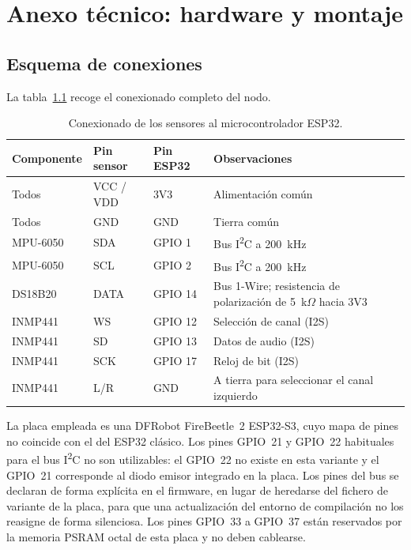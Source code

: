 \chapter{Anexo técnico: hardware y montaje}
\label{anexo:hardware}

\section{Esquema de conexiones}

La tabla~\ref{table:pinout} recoge el conexionado completo del nodo.

\begin{table}[ht!]
\caption{Conexionado de los sensores al microcontrolador ESP32.}
\label{table:pinout}
\centering
\begin{tabular}{|p{3cm}|p{2.5cm}|p{2cm}|p{5cm}|}
\hline
\textbf{Componente} & \textbf{Pin sensor} & \textbf{Pin ESP32} & \textbf{Observaciones} \\
\hline
Todos & VCC / VDD & 3V3 & Alimentación común \\
\hline
Todos & GND & GND & Tierra común \\
\hline
MPU-6050 & SDA & GPIO 1 & Bus I\textsuperscript{2}C a \mbox{200 kHz} \\
\hline
MPU-6050 & SCL & GPIO 2 & Bus I\textsuperscript{2}C a \mbox{200 kHz} \\
\hline
DS18B20 & DATA & GPIO 14 & Bus 1-Wire; resistencia de polarización de
\mbox{5 k$\Omega$} hacia 3V3 \\
\hline
INMP441 & WS & GPIO 12 & Selección de canal (I2S) \\
\hline
INMP441 & SD & GPIO 13 & Datos de audio (I2S) \\
\hline
INMP441 & SCK & GPIO 17 & Reloj de bit (I2S) \\
\hline
INMP441 & L/R & GND & A tierra para seleccionar el canal izquierdo \\
\hline
\end{tabular}
\end{table}

La placa empleada es una DFRobot FireBeetle~2 ESP32-S3, cuyo mapa de pines no coincide con
el del ESP32 clásico. Los pines GPIO~21 y GPIO~22 habituales para el bus
I\textsuperscript{2}C no son utilizables: el GPIO~22 no existe en esta variante y el GPIO~21
corresponde al diodo emisor integrado en la placa. Los pines del bus se declaran de forma
explícita en el firmware, en lugar de heredarse del fichero de variante de la placa, para
que una actualización del entorno de compilación no los reasigne de forma silenciosa. Los
pines GPIO~33 a GPIO~37 están reservados por la memoria PSRAM octal de esta placa y no deben
cablearse.

